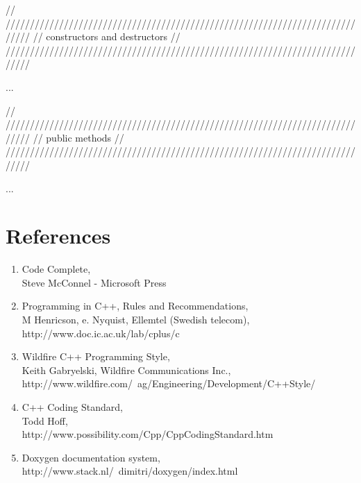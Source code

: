 \documentclass[a4paper,11pt,oneside]{scrbook}
\begin{document}
\begin{code}
  // /////////////////////////////////////////////////////////////////////////////
  // constructors and destructors
  // /////////////////////////////////////////////////////////////////////////////

  ...

  // /////////////////////////////////////////////////////////////////////////////
  // public methods
  // /////////////////////////////////////////////////////////////////////////////

  ...
\end{code}
 
\chapter{References}
\label{cha:references}

\begin{enumerate}
  \item
    Code Complete, \\
    Steve McConnel - Microsoft Press
    \label{bib:1}

  \item
    Programming in C++, Rules and Recommendations, \\
    M Henricson, e. Nyquist, Ellemtel (Swedish telecom), \\
    http://www.doc.ic.ac.uk/lab/cplus/c%
    \label{bib:2}

  \item
    Wildfire C++ Programming Style, \\
    Keith Gabryelski, Wildfire Communications Inc., \\
    http://www.wildfire.com/~ag/Engineering/Development/C++Style/
    \label{bib:3}

  \item
    C++ Coding Standard, \\
    Todd Hoff, \\
    http://www.possibility.com/Cpp/CppCodingStandard.htm 
    \label{bib:4}

  \item
    Doxygen documentation system, \\
    http://www.stack.nl/~dimitri/doxygen/index.html
    \label{bib:5}
\end{enumerate}
%
\end{document}
